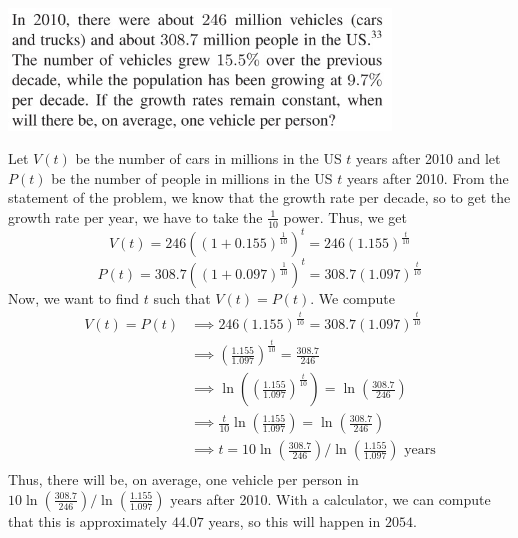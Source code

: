 \documentclass[11pt]{exam}
\begin{document}
\begin{questions}
\begin{parts}
        \includegraphics[width=4in]{Figures/no53.jpg}
        \begin{solution}
          Let \(V(t)\) be the number of cars in millions in the US \(t\) years after 2010
          and let \(P(t)\) be the number of people in millions in the US \(t\)
          years after 2010. From the statement of the problem, we know
          that the growth rate per decade, so to get the growth rate
          per year, we have to take the \(\frac{1}{10}\) power. Thus,
          we get \[
            V(t) = 246((1+0.155)^{\frac{1}{10}})^t =
            246(1.155)^{\frac{t}{10}}
            \]\[
            P(t) = 308.7((1+0.097)^{\frac{1}{10}})^t = 308.7(1.097)^{\frac{t}{10}}
          \]
          Now, we want to find \(t\) such that \(V(t) = P(t)\). We
          compute
          \begin{align*}
            V(t) = P(t)
            & \implies 246(1.155)^{\frac{t}{10}} =
                          308.7(1.097)^{\frac{t}{10}} \\
           & \implies \left( \frac{1.155}{1.097}
             \right)^{\frac{t}{10}} = \frac{308.7}{246}\\
           & \implies \ln\left(  \left( \frac{1.155}{1.097}
             \right)^{\frac{t}{10}} \right) = \ln\left(\frac{308.7}{246}\right)\\
           & \implies \frac{t}{10}\ln\left(   \frac{1.155}{1.097}
             \right)  = \ln\left(\frac{308.7}{246}\right)\\
           & \implies t 
             = 10 \ln\left(\frac{308.7}{246}\right) /
             \ln\left(   \frac{1.155}{1.097} \right) \text{ years}\\
          \end{align*}
          Thus, there will be, on average, one vehicle per person in \(10 \ln\left(\frac{308.7}{246}\right) /
             \ln\left(   \frac{1.155}{1.097} \right) \text{ years}\)
             after 2010.
          With a calculator, we can compute that this is approximately
          \(44.07\) years, so this will happen in \(2054\).
        \end{solution}
      \end{parts}

\end{questions}
\end{document}

